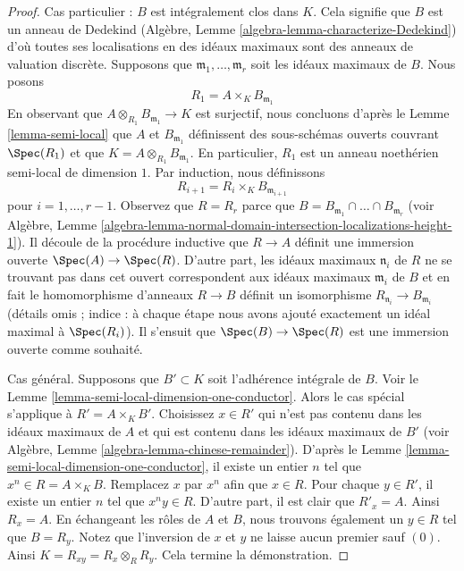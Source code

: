 \begin{proof}
Cas particulier : $B$ est intégralement clos dans $K$.
Cela signifie que $B$ est un anneau de Dedekind (Algèbre,
Lemme \ref{algebra-lemma-characterize-Dedekind}) d'où toutes
ses localisations en des idéaux maximaux sont des anneaux
de valuation discrète. Supposons que $\mathfrak m_1, \ldots,
\mathfrak m_r$ soit les idéaux maximaux de $B$. Nous posons
$$
R_1 = A \times_K B_{\mathfrak m_1}
$$
En observant que $A \otimes_{R_1} B_{\mathfrak m_1} \to K$ est surjectif,
nous concluons d'après le Lemme \ref{lemma-semi-local} que $A$ et
$B_{\mathfrak m_1}$ définissent des sous-schémas ouverts couvrant $\Spec(R_1)$
et que $K = A \otimes_{R_1} B_{\mathfrak m_1}$. En particulier, $R_1$ est un
anneau noethérien semi-local de dimension $1$. Par induction, nous définissons
$$
R_{i + 1} = R_i \times_K B_{\mathfrak m_{i + 1}}
$$
pour $i = 1, \ldots, r - 1$. Observez que $R = R_r$ parce
que $B = B_{\mathfrak m_1} \cap \ldots \cap B_{\mathfrak
m_r}$ (voir Algèbre, Lemme
\ref{algebra-lemma-normal-domain-intersection-localizations-height-1}).
Il découle de la procédure inductive que $R \to A$ définit
une immersion ouverte $\Spec(A) \to \Spec(R)$. D'autre part,
les idéaux maximaux $\mathfrak n_i$ de $R$ ne se trouvant pas
dans cet ouvert correspondent aux idéaux maximaux $\mathfrak
m_i$ de $B$ et en fait le homomorphisme d'anneaux $R \to B$
définit un isomorphisme $R_{\mathfrak n_i} \to B_{\mathfrak
m_i}$ (détails omis ; indice : à chaque étape nous avons ajouté
exactement un idéal maximal à $\Spec(R_i)$). Il s'ensuit que
$\Spec(B) \to \Spec(R)$ est une immersion ouverte comme souhaité.

\medskip\noindent
Cas général. Supposons que $B' \subset K$ soit l'adhérence
intégrale de $B$. Voir le Lemme
\ref{lemma-semi-local-dimension-one-conductor}. Alors le cas
spécial s'applique à $R' = A \times_K B'$. Choisissez $x \in R'$
qui n'est pas contenu dans les idéaux maximaux de $A$ et qui est
contenu dans les idéaux maximaux de $B'$ (voir Algèbre, Lemme
\ref{algebra-lemma-chinese-remainder}). D'après le Lemme
\ref{lemma-semi-local-dimension-one-conductor}, il existe un
entier $n$ tel que $x^n \in R = A \times_K B$. Remplacez $x$ par
$x^n$ afin que $x \in R$. Pour chaque $y \in R'$, il existe un
entier $n$ tel que $x^n y \in R$. D'autre part, il est clair que
$R'_x = A$. Ainsi $R_x = A$. En échangeant les rôles de $A$ et
$B$, nous trouvons également un $y \in R$ tel que $B = R_y$. Notez
que l'inversion de $x$ et $y$ ne laisse aucun premier sauf $(0)$.
Ainsi $K = R_{xy} = R_x \otimes_R R_y$. Cela termine la démonstration.
\end{proof}

